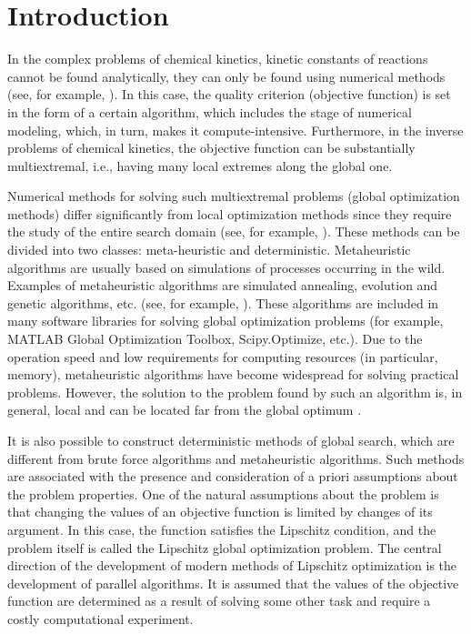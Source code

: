 \documentclass[mathematics,article,submit,pdftex,moreauthors]{Definitions/mdpi}
\begin{document}
\section{Introduction}



In the complex problems of chemical kinetics, kinetic constants of reactions cannot be found analytically, they can only be found using numerical methods (see, for example, \cite{Zaynullin2020,Enikeeva2020,Koledina2019}). In this case, the quality criterion (objective function) is set in the form of a certain algorithm, which includes the stage of numerical modeling, which, in turn, makes it compute-intensive. Furthermore, in the inverse problems of chemical kinetics, the objective function can be substantially multiextremal, i.e., having many local extremes along the global one. 

Numerical methods for solving such multiextremal problems (global optimization methods) differ significantly from local optimization methods since they require the study of the entire search domain (see, for example, \cite{PaulaviciusZilinskas2014,Sergeyev2017}). These methods can be divided into two classes: meta-heuristic and deterministic. Metaheuristic algorithms are usually based on simulations of processes occurring in the wild.
Examples of metaheuristic algorithms are simulated annealing, evolution and genetic algorithms, etc. (see, for example, \cite{Battiti2009,Eiben2015}).
These algorithms are included in many software libraries for solving global optimization problems (for example, MATLAB Global Optimization Toolbox, Scipy.Optimize, etc.).
Due to the operation speed and low requirements for computing resources (in particular, memory), metaheuristic algorithms have become widespread for solving practical problems. However, the solution to the problem found by such an algorithm is, in general, local and can be located far from the global optimum \cite{Kvasov2018}. 

It is also possible to construct deterministic methods of global search, which are different from brute force algorithms and metaheuristic algorithms. Such methods are associated with the presence and consideration of a priori assumptions about the problem properties. 
One of the natural assumptions about the problem is that changing the values of an objective function is limited by changes of its argument. In this case, the function satisfies the Lipschitz condition, and the problem itself is called the Lipschitz global optimization problem. The central direction of the development of modern methods of Lipschitz optimization is the development of parallel algorithms. It is assumed that the values of the objective function are determined as a result of solving some other task and require a costly computational experiment.
\end{document}
